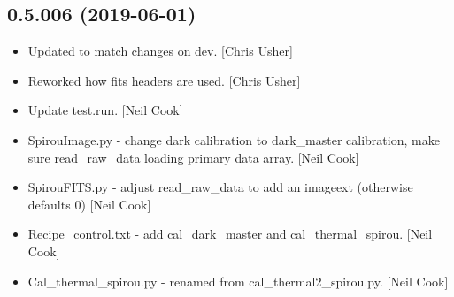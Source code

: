 \documentclass[a4paper,10pt,english]{report}
\begin{document}
\subsection{0.5.006 (2019-06-01)}
\label{\detokenize{misc/changelog:id129}}\begin{itemize}
\item {} 
Updated to match changes on dev. {[}Chris Usher{]}

\item {} 
Reworked how fits headers are used. {[}Chris Usher{]}

\item {} 
Update test.run. {[}Neil Cook{]}

\item {} 
SpirouImage.py - change dark calibration to dark\_master calibration,
make sure read\_raw\_data loading primary data array. {[}Neil Cook{]}

\item {} 
SpirouFITS.py - adjust read\_raw\_data to add an imageext (otherwise
defaults 0) {[}Neil Cook{]}

\item {} 
Recipe\_control.txt - add cal\_dark\_master and cal\_thermal\_spirou. {[}Neil
Cook{]}

\item {} 
Cal\_thermal\_spirou.py - renamed from cal\_thermal2\_spirou.py. {[}Neil
Cook{]}

\end{itemize}
\end{document}
